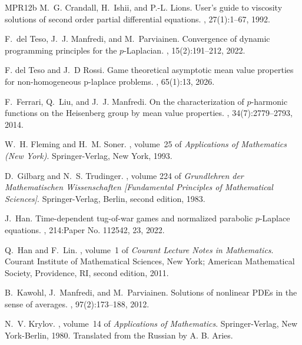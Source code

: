 \documentclass[english]{amsart}
\theoremstyle{plain}
\theoremstyle{definition}
\theoremstyle{remark}
\numberwithin{equation}{section}
\begin{document}
\begin{thebibliography}{MPR12b}
M.~G. Crandall, H.~Ishii, and P.-L. Lions.
\newblock User's guide to viscosity solutions of second order partial
  differential equations.
, 27(1):1--67, 1992.

F.~del Teso, J.~J. Manfredi, and M.~Parviainen.
\newblock Convergence of dynamic programming principles for the
  {$p$}-{L}aplacian.
, 15(2):191--212, 2022.

F. del Teso and J.~D Rossi.
\newblock Game theoretical asymptotic mean value properties for non-homogeneous
  p-laplace problems.
, 65(1):13, 2026.

F.~Ferrari, Q.~Liu, and J.~J. Manfredi.
\newblock On the characterization of {$p$}-harmonic functions on the
  {H}eisenberg group by mean value properties.
, 34(7):2779--2793, 2014.

W.~H. Fleming and H.~M. Soner.
,
  volume~25 of {\em Applications of Mathematics (New York)}.
\newblock Springer-Verlag, New York, 1993.

D.~Gilbarg and N.~S. Trudinger.
, volume
  224 of {\em Grundlehren der Mathematischen Wissenschaften [Fundamental
  Principles of Mathematical Sciences]}.
\newblock Springer-Verlag, Berlin, second edition, 1983.

J.~Han.
\newblock Time-dependent tug-of-war games and normalized parabolic
  {$p$}-{L}aplace equations.
, 214:Paper No. 112542, 23, 2022.

Q.~Han and F.~Lin.
, volume~1 of {\em
  Courant Lecture Notes in Mathematics}.
\newblock Courant Institute of Mathematical Sciences, New York; American
  Mathematical Society, Providence, RI, second edition, 2011.

B.~Kawohl, J.~Manfredi, and M.~Parviainen.
\newblock Solutions of nonlinear {PDE}s in the sense of averages.
, 97(2):173--188, 2012.

N.~V. Krylov.
, volume~14 of {\em Applications
  of Mathematics}.
\newblock Springer-Verlag, New York-Berlin, 1980.
\newblock Translated from the Russian by A. B. Aries.


\end{thebibliography}
\end{document}
